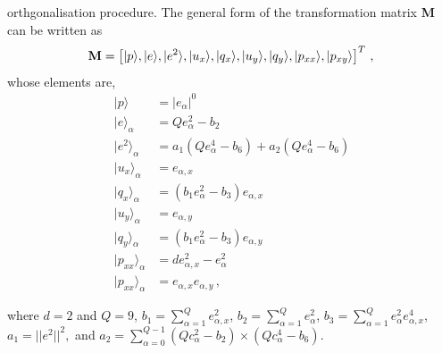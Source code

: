orthgonalisation procedure. The general form of the transformation matrix 
\textbf{M} can be written as
%
\begin{equation}
\mathbf{M} =  
\left[|p\rangle,|e\rangle,|e^2\rangle,|u_x\rangle,|q_x\rangle,|u_y\rangle,
|q_y\rangle,|p_{xx}\rangle,|p_{xy}\rangle\right]^T \,, \\
\end{equation}
% 
\noindent whose elements are, 
%
\begin{subequations}
\begin{align}
|p\rangle & =  |\mathit{e}_{\alpha}|^0\\
|e\rangle_{\alpha} & = \mathit{Q}e_{\alpha}^2-b_2\\
|e^2\rangle_{\alpha} & =  	
a_1(\mathit{Q}e_{\alpha}^4-b_6)+a_2(\mathit{Q}e_{\alpha}^4-b_6)\\
|u_x\rangle_{\alpha} & = e_{\alpha,x} \\
|q_x\rangle_{\alpha} & = (\mathit{b}_1e_{\alpha}^2-b_3)e_{\alpha,x}\\
|u_y\rangle_{\alpha} & = e_{\alpha,y}\\
|q_y\rangle_{\alpha} & = (\mathit{b}_1e_{\alpha}^2-b_3)e_{\alpha,y}\\
|p_{xx}\rangle_{\alpha} & = \mathit{d}e_{\alpha,x}^2-e_{\alpha}^2\\
|p_{xx}\rangle_{\alpha}  & = e_{\alpha,x}e_{\alpha,y} \,,
\end{align}
\end{subequations}

\noindent where $d = 2$ and $Q = 9$, $b_1=\sum_{\alpha=1}^{Q}e_{\alpha,x}^2$, 
$b_2=\sum_{\alpha=1}^{Q}e_{\alpha}^2$, 
$b_3=\sum_{\alpha=1}^{Q}e_{\alpha}^2e_{\alpha,x}^4$, $a_1=||e^2||^2,$ and 
$a_2=\sum_{\alpha=0}^{Q-1}(Qc_{\alpha}^2-b_2)\times(Qc_{\alpha}^4-b_6)$. 

